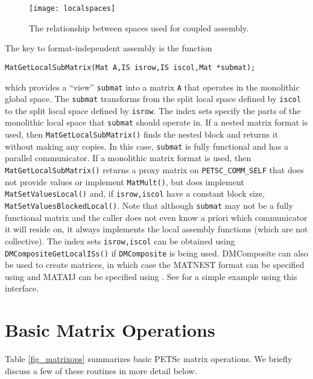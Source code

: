 \begin{figure}
\centerline{\texttt{[image: localspaces]}}
\caption{The relationship between spaces used for coupled assembly.}
\label{fig_localspaces}
\end{figure}

The key to format-independent assembly is the function
\begin{lstlisting}
MatGetLocalSubMatrix(Mat A,IS isrow,IS iscol,Mat *submat);
\end{lstlisting}
which provides a ``view'' \lstinline{submat} into a matrix \lstinline{A} that operates in the monolithic global space.
The \lstinline{submat} transforms from the split local space defined by \lstinline{iscol} to the split local space defined by \lstinline{isrow}.
The index sets specify the parts of the monolithic local space that \lstinline{submat} should operate in.
If a nested matrix format is used, then \lstinline{MatGetLocalSubMatrix()} finds the nested block and returns it without making any copies.
In this case, \lstinline{submat} is fully functional and has a parallel communicator.
If a monolithic matrix format is used, then \lstinline{MatGetLocalSubMatrix()} returns a proxy matrix on \lstinline{PETSC_COMM_SELF} that does not provide values or implement \lstinline{MatMult()}, but does implement \lstinline{MatSetValuesLocal()} and, if \lstinline{isrow,iscol} have a constant block size, \lstinline{MatSetValuesBlockedLocal()}.
Note that although \lstinline{submat} may not be a fully functional matrix and the caller does not even know a priori which communicator it will reside on, it always implements the local assembly functions (which are not collective).
The index sets \lstinline{isrow,iscol} can be obtained using \break\lstinline{DMCompositeGetLocalISs()} if \lstinline{DMComposite} is being used.
DMComposite can also be used to create matrices, in which case the MATNEST format can be specified using  and MATAIJ can be specified using .
See \href{http://www.mcs.anl.gov/petsc/petsc-current/src/snes/examples/tutorials/ex28.c.html}{} for a simple example using this interface.

\section{Basic Matrix Operations}
\label{sec_matoptions}

Table \ref{fig_matrixops} summarizes basic PETSc matrix operations.
We briefly discuss a few of these routines in more detail below.

